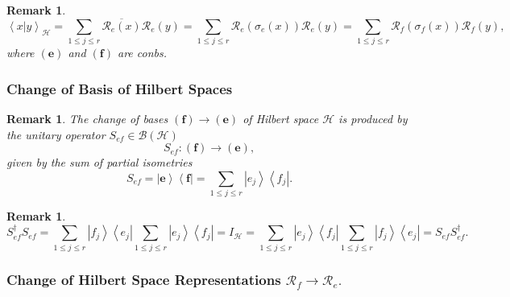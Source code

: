 \documentclass[aps,preprint]{revtex4}
\newtheorem{remark}[theorem]{Remark}
\begin{document}
\begin{remark}
\begin{equation}
\left\langle \left. x\right\vert y\right\rangle _{\mathcal{H}}=\sum_{1\leq
j\leq r}\overline{\mathcal{R}_{e}\left( x\right) }\mathcal{R}_{e}\left(
y\right) =\sum_{1\leq j\leq r}\mathcal{R}_{e}\left( \sigma _{e}\left(
x\right) \right) \mathcal{R}_{e}\left( y\right) =\sum_{1\leq j\leq r}%
\mathcal{R}_{f}\left( \sigma _{f}\left( x\right) \right) \mathcal{R}%
_{f}\left( y\right) ,
\end{equation}%
where $\left( \mathbf{e}\right) $ and $\left( \mathbf{f}\right) $ are conbs.
\end{remark}

\subsubsection{Change of Basis of Hilbert Spaces}

\begin{remark}
The change of bases $\left( \mathbf{f}\right) \rightarrow \left( \mathbf{e}%
\right) $ of Hilbert space $\mathcal{H}$ is produced by the unitary operator 
$S_{ef}\in \mathcal{B}\left( \mathcal{H}\right) $ 
\begin{equation}
S_{ef}:\left( \mathbf{f}\right) \rightarrow \left( \mathbf{e}\right) ,
\end{equation}%
given by the sum of partial isometries 
\begin{equation}
S_{ef}=\left\vert \boldsymbol{e}\right\rangle \left\langle \boldsymbol{f}%
\right\vert =\sum_{1\leq j\leq r}\left\vert e_{j}\right\rangle \left\langle
f_{j}\right\vert .
\end{equation}
\end{remark}

\begin{remark}
\begin{equation}
S_{ef}^{\dagger }S_{ef}=\sum_{1\leq j\leq r}\left\vert f_{j}\right\rangle
\left\langle e_{j}\right\vert \sum_{1\leq j\leq r}\left\vert
e_{j}\right\rangle \left\langle f_{j}\right\vert =I_{\mathcal{H}%
}=\sum_{1\leq j\leq r}\left\vert e_{j}\right\rangle \left\langle
f_{j}\right\vert \sum_{1\leq j\leq r}\left\vert f_{j}\right\rangle
\left\langle e_{j}\right\vert =S_{ef}S_{ef}^{\dagger }.
\end{equation}
\end{remark}

\subsubsection{Change of Hilbert Space Representations $\mathcal{R}%
_{f}\rightarrow \mathcal{R}_{e}.$}
\end{document}
